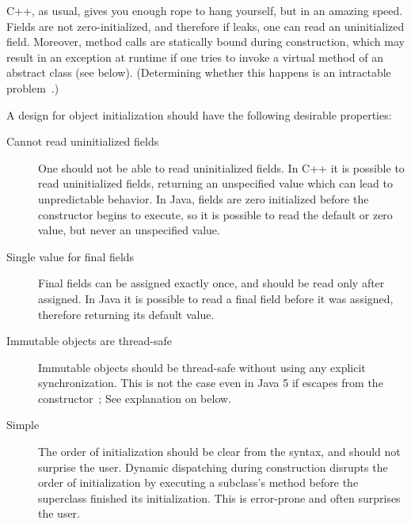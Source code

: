 \mbox{C++}, as usual, gives you enough rope to hang yourself, but in an amazing speed.
Fields are not zero-initialized, and therefore if \this leaks,
    one can read an uninitialized field.
Moreover, method calls are statically bound during construction,
    which may result in an exception at runtime
    if one tries to invoke a virtual method of an abstract class (see  below).
(Determining whether this happens is an intractable problem~\cite{Gil:1998:CTA:646155.679689}.)

A design for object initialization should have the following
    desirable properties:
\begin{description}

  \item[Cannot read uninitialized fields]
    One should not be able to read uninitialized fields.
    In \mbox{C++} it is possible to read uninitialized fields,
        returning an unspecified value which can lead to unpredictable behavior.
    In Java, fields are zero initialized before the constructor begins to execute,
        so it is possible to read the default or zero value,
        but never an unspecified value.

  \item[Single value for final fields]
    Final fields can be assigned exactly once, and
        should be read only after assigned.
    In Java it is possible to read a final field before it was assigned,
        therefore returning its default value.

  \item[Immutable objects are thread-safe]
    Immutable objects should be thread-safe without using any explicit synchronization.
    This is not the case even in Java 5 if \this escapes from the constructor~\cite{JSR133};
        See explanation on  below.


  \item[Simple]
    The order of initialization should be clear from the syntax, %
        and should not surprise the user.
    Dynamic dispatching during construction disrupts the order
        of initialization by executing a subclass's method before the superclass finished its initialization.
    This is error-prone and often surprises the user.


\end{description}
